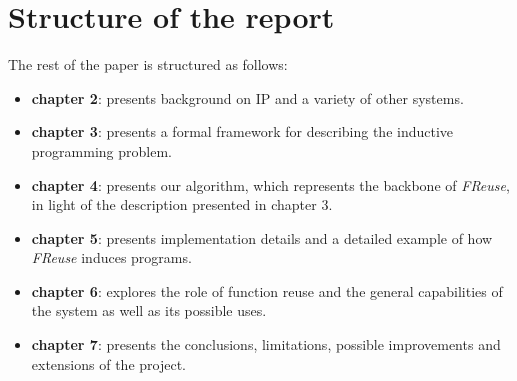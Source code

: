 \section{Structure of the report}
\indent \indent The rest of the paper is structured as follows: 
\begin{itemize}
\item \textbf{chapter 2}: presents background on IP and a variety of other systems.
\item \textbf{chapter 3}: presents a formal framework for describing the inductive programming problem.
\item \textbf{chapter 4}: presents our algorithm, which represents the backbone of \textit{FReuse}, in light of the description presented in chapter 3.
\item \textbf{chapter 5}: presents implementation details and a detailed example of how \textit{FReuse} induces programs.
\item \textbf{chapter 6}: explores the role of function reuse and the general capabilities of the system as well as its possible uses.
\item \textbf{chapter 7}: presents the conclusions, limitations, possible improvements and extensions of the project.
\end{itemize} 


